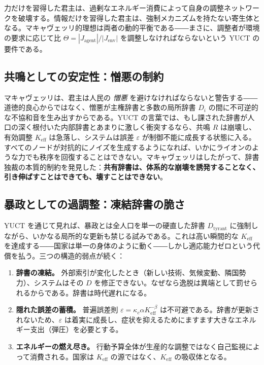 \documentclass[12pt,a4paper]{article}
\newcommand{\Keff}{K_{\mathrm{eff}}}
\begin{document}
	力だけを習得した君主は、過剰なエネルギー消費によって自身の調整ネットワークを破壊する。情報だけを習得した君主は、強制メカニズムを持たない寄生体となる。マキャヴェッリ的理想は両者の動的平衡である――まさに、調整者が環境の要求に応じて比 \(\Theta = |J_{\mathrm{agent}}|/|J_{\mathrm{env}}|\) を調整しなければならないという YUCT の要件である。
	
	\subsection{共鳴としての安定性：憎悪の制約}
	
	マキャヴェッリは、君主は人民の \emph{憎悪} を避けなければならないと警告する――道徳的良心からではなく、憎悪が主権辞書と多数の局所辞書 \(D_i\) の間に不可逆的な不協和音を生み出すからである。YUCT の言葉では、もし課された辞書が人口の深く根付いた内部辞書とあまりに激しく衝突するなら、共鳴 \(R\) は崩壊し、有効調整 \(\Keff\) は急落し、システムは誤差 \(\varepsilon\) が制御不能に成長する状態に入る。すべてのノードが対抗的にノイズを生成するようになれば、いかにライオンのような力でも秩序を回復することはできない。マキャヴェッリはしたがって、辞書独裁の本質的制約を発見した：\textbf{共有辞書は、体系的な崩壊を誘発することなく、引き伸ばすことはできても、壊すことはできない}。
	
	\subsection{暴政としての過調整：凍結辞書の脆さ}
	
	YUCT を通じて見れば、暴政とは全人口を単一の硬直した辞書 \(D_{\text{tyrant}}\) に強制しながら、いかなる局所的な更新も禁じる試みである。これは高い瞬間的な \(\Keff\) を達成する――国家は単一の身体のように動く――しかし適応能力ゼロという代償を払う。三つの構造的弱点が続く：
	
	\begin{enumerate}[leftmargin=*]
		\item \textbf{辞書の凍結。} 外部索引が変化したとき（新しい技術、気候変動、隣国勢力）、システムはその \(D\) を修正できない。なぜなら逸脱は異端として罰せられるからである。辞書は時代遅れになる。
		\item \textbf{隠れた誤差の蓄積。} 普遍誤差則 \(\varepsilon = \kappa_c \alpha \Keff^{-\beta}\) は不可避である。辞書が更新されないため、\(\varepsilon\) は着実に成長し、症状を抑えるためにますます大きなエネルギー支出（弾圧）を必要とする。
		\item \textbf{エネルギーの燃え尽き。} 行動予算全体が生産的な調整ではなく自己監視によって消費される。国家は \(K_{\mathrm{eff}}\) の源ではなく、\(K_{\mathrm{eff}}\) の吸収体となる。
	\end{enumerate}
	
\end{document}
